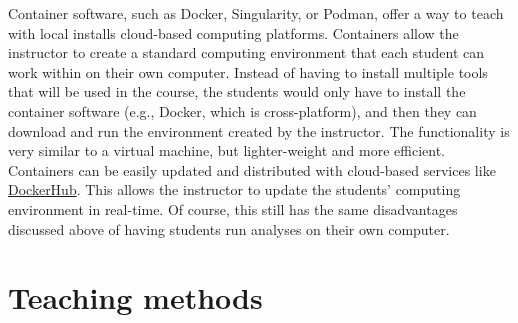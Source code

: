 Container software, such as
Docker,
Singularity,
or
Podman,
offer a way to  teach with local installs 
cloud-based computing platforms.
Containers allow the instructor to create a standard computing environment that
each student can work within on their own computer.
Instead of having to install multiple tools that will be used in the course,
the students would only have to install the container software (e.g., Docker,
which is cross-platform), and then they can download and run the environment
created by the instructor.
The functionality is very similar to a virtual machine, but lighter-weight and
more efficient.
Containers can be easily updated and distributed with cloud-based
services like
\href{https://hub.docker.com/}{DockerHub}.
This allows the instructor to update the students' computing environment in
real-time.
Of course, this still has the same disadvantages discussed above of having
students run analyses on their own computer.

\section{Teaching methods}


